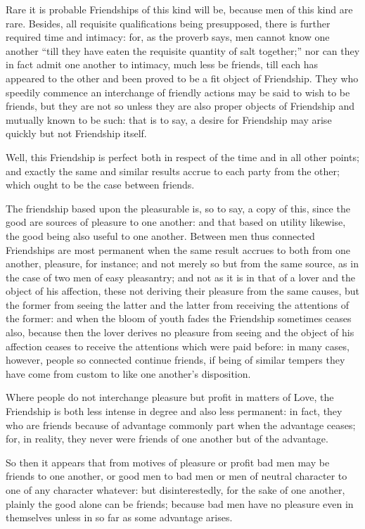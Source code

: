 Rare it is probable Friendships of this kind will be, because men of this kind
are rare. Besides, all requisite qualifications being presupposed, there is
further required time and intimacy: for, as the proverb says, men cannot know
one another “till they have eaten the requisite quantity of salt
together;” nor can they in fact admit one another to intimacy, much less
be friends, till each has appeared to the other and been proved to be a fit
object of Friendship. They who speedily commence an interchange of friendly
actions may be said to wish to be friends, but they are not so unless they are
also proper objects of Friendship and mutually known to be such: that is to
say, a desire for Friendship may arise quickly but not Friendship itself.

Well, this Friendship is perfect both in respect of the time and in all other
points; and exactly the same and similar results accrue to each party from the
other; which ought to be the case between friends.

The friendship based upon the pleasurable is, so to say, a copy of this, since
the good are sources of pleasure to one another: and that based on utility
likewise, the good being also useful to one another. Between men thus connected
Friendships are most permanent when the same result accrues to both from one
another, pleasure, for instance; and not merely so but from the same source, as
in the case of two men of easy pleasantry; and not as it is in that of a lover
and the object of his affection, these not deriving their pleasure from the
same causes, but the former from seeing the latter and the latter from
receiving the attentions of the former: and when the bloom of youth fades the
Friendship sometimes ceases also, because then the lover derives no pleasure
from seeing and the object of his affection ceases to receive the attentions
which were paid before: in many cases, however, people so connected continue
friends, if being of similar tempers they have come from custom to like one
another’s disposition.

Where people do not interchange pleasure but profit in matters of Love, the
Friendship is both less intense in degree and also less permanent: in fact,
they who are friends because of advantage commonly part when the advantage
ceases; for, in reality, they never were friends of one another but of the
advantage.

So then it appears that from motives of pleasure or profit bad men may be
friends to one another, or good men to bad men or men of neutral character to
one of any character whatever: but disinterestedly, for the sake of one
another, plainly the good alone can be friends; because bad men have no
pleasure even in themselves unless in so far as some advantage arises.


